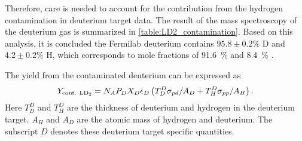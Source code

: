 \documentclass[../main.tex]{subfiles}
\begin{document}
Therefore, care is needed to account for the contribution from the hydrogen contamination in deuterium
target data. The result of the mass spectroscopy of the deuterium gas \cite{paul-1893} is
summarized in \cref{table:LD2_contamination}. Based on this analysis, it is concluded the Fermilab
deuterium contains $95.8\pm0.2\%$ D and $4.2\pm0.2\%$ H,
which corresponds to mole fractions of \SI{91.6}{\percent}  and \SI{8.4}{\percent} .

The yield from the contaminated deuterium can be expressed as
\begin{equation}
	Y_{\mathrm{cont.~\ce{LD_2}}} = N_A P_D X_D \epsilon_D \left( T_D^D \sigma_{pd}/A_D + T^D_H \sigma_{pp}/A_H   \right).
\end{equation}
Here $T_D^D$ and $T^D_H$ are the thickness of deuterium and hydrogen in the deuterium target.
$A_H$ and $A_D$ are the atomic mass of hydrogen and deuterium.
The subscript $D$ denotes these deuterium target specific quantities.
\end{document}
